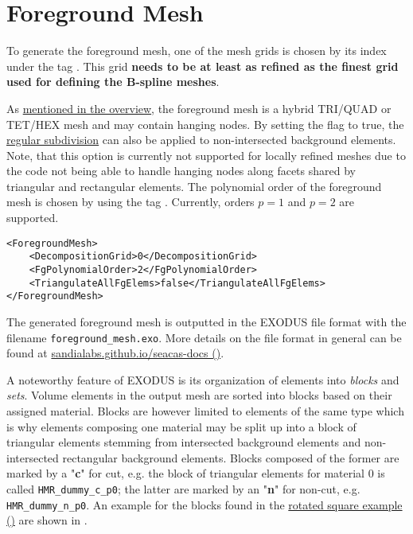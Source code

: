 \section{Foreground Mesh}
\label{sec:tutorial_foreground}

To generate the foreground mesh, one of the mesh grids is chosen by its index under the tag . This grid \textbf{needs to be at least as refined as the finest grid used for defining the B-spline meshes}.

As \hyperlink{foreground_mesh_properties}{mentioned in the overview}, the foreground mesh is a hybrid TRI/QUAD or TET/HEX mesh and may contain hanging nodes. By setting the flag  to true, the \hyperlink{regular_subdivision}{regular subdivision} can also be applied to non-intersected background elements. Note, that this option is currently not supported for locally refined meshes due to the code not being able to handle hanging nodes along facets shared by triangular and rectangular elements. The polynomial order of the foreground mesh is chosen by using the tag . Currently, orders $p=1$ and $p=2$ are supported.

\begin{minipage}{\linewidth}
\vspace{0.5cm}
\begin{lstlisting}[caption={Definition of a multiple mesh grids},captionpos=b, label={lst:fg_mesh}]
<ForegroundMesh>
    <DecompositionGrid>0</DecompositionGrid>
    <FgPolynomialOrder>2</FgPolynomialOrder>
    <TriangulateAllFgElems>false</TriangulateAllFgElems>
</ForegroundMesh>
\end{lstlisting}
\end{minipage}

The generated foreground mesh is outputted in the EXODUS file format with the filename \texttt{foreground\_mesh.exo}. More details on the file format in general can be found at \href{https://sandialabs.github.io/seacas-docs/html/index.html}{sandialabs.github.io/seacas-docs (\ExternalLink)}.

\vspace{0.2cm}

A noteworthy feature of EXODUS is its organization of elements into \emph{blocks} and \emph{sets}. Volume elements in the output mesh are sorted into blocks based on their assigned material. Blocks are however limited to elements of the same type which is why elements composing one material may be split up into a block of triangular elements stemming from intersected background elements and non-intersected rectangular background elements. Blocks composed of the former are marked by a "\textbf{c}" for cut, e.g. the block of triangular elements for material $0$ is called \texttt{HMR\_dummy\_c\_p0}; the latter are marked by an "\textbf{n}" for non-cut, e.g. \texttt{HMR\_dummy\_n\_p0}. An example for the blocks found in the \href{https://github.com/kkmaute/moris/blob/main/share/doc/mesh_generation/examples/Rotated_Square_Example.xml}{rotated square example (\ExternalLink)} are shown in .

